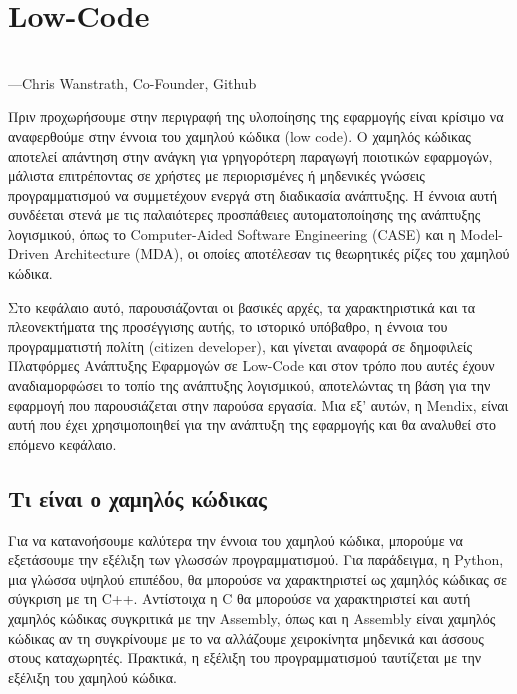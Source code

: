 \chapter{Low-Code} \label{ch:low-code}
    \begin{displayquote} \centering
         \\
        \hspace*{\fill}---Chris Wanstrath, Co-Founder, Github
    \end{displayquote}
    \vspace{1em}

    Πριν προχωρήσουμε στην περιγραφή της υλοποίησης της εφαρμογής είναι κρίσιμο να αναφερθούμε στην έννοια του χαμηλού κώδικα (low code). Ο χαμηλός κώδικας αποτελεί απάντηση στην ανάγκη για γρηγορότερη παραγωγή ποιοτικών εφαρμογών, μάλιστα επιτρέποντας σε χρήστες με περιορισμένες ή μηδενικές γνώσεις προγραμματισμού να συμμετέχουν ενεργά στη διαδικασία ανάπτυξης. Η έννοια αυτή συνδέεται στενά με τις παλαιότερες προσπάθειες αυτοματοποίησης της ανάπτυξης λογισμικού, όπως το Computer-Aided Software Engineering (CASE) και η Model-Driven Architecture (MDA), οι οποίες αποτέλεσαν τις θεωρητικές ρίζες του χαμηλού κώδικα.

    Στο κεφάλαιο αυτό, παρουσιάζονται οι βασικές αρχές, τα χαρακτηριστικά και τα πλεονεκτήματα της προσέγγισης αυτής, το ιστορικό υπόβαθρο, η έννοια του προγραμματιστή πολίτη (citizen developer), και γίνεται αναφορά σε δημοφιλείς Πλατφόρμες Ανάπτυξης Εφαρμογών σε Low-Code και στον τρόπο που αυτές έχουν αναδιαμορφώσει το τοπίο της ανάπτυξης λογισμικού, αποτελώντας τη βάση για την εφαρμογή που παρουσιάζεται στην παρούσα εργασία. Μια εξ' αυτών, η Mendix, είναι αυτή που έχει χρησιμοποιηθεί για την ανάπτυξη της εφαρμογής και θα αναλυθεί στο επόμενο κεφάλαιο.


    \section{Τι είναι ο χαμηλός κώδικας}
        \begin{displayquote} \justifying
             \cite{Ibm_2024}
        \end{displayquote}

        Για να κατανοήσουμε καλύτερα την έννοια του χαμηλού κώδικα, μπορούμε να εξετάσουμε την εξέλιξη των γλωσσών προγραμματισμού. Για παράδειγμα, η Python, μια γλώσσα υψηλού επιπέδου, θα μπορούσε να χαρακτηριστεί ως χαμηλός κώδικας σε σύγκριση με τη C++. Αντίστοιχα η C θα μπορούσε να χαρακτηριστεί και αυτή χαμηλός κώδικας συγκριτικά με την Assembly, όπως και η Assembly είναι χαμηλός κώδικας αν τη συγκρίνουμε με το να αλλάζουμε χειροκίνητα μηδενικά και άσσους στους καταχωρητές. Πρακτικά, η εξέλιξη του προγραμματισμού ταυτίζεται με την εξέλιξη του χαμηλού κώδικα.

